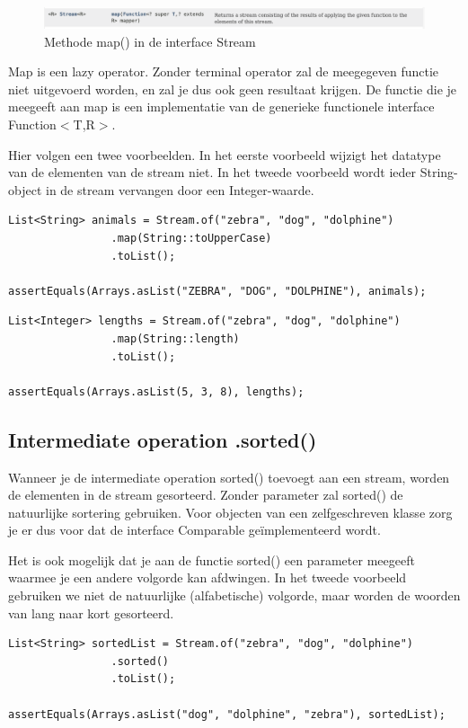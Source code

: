 \begin{figure}[H]
  \includegraphics[width=\linewidth]{images/h6/stream_map.png}
  \caption{Methode map() in de interface Stream}
  \label{fig:stream_foreach}
\end{figure}

Map is een lazy operator. Zonder terminal operator zal de meegegeven functie niet uitgevoerd worden, en zal je dus ook geen resultaat krijgen. De functie die je meegeeft aan map is een implementatie van de generieke functionele interface Function$<$T,R$>$.

Hier volgen een twee voorbeelden. In het eerste voorbeeld wijzigt het datatype van de elementen van de stream niet. In het tweede voorbeeld wordt ieder String-object in de stream vervangen door een Integer-waarde.

\begin{lstlisting}
List<String> animals = Stream.of("zebra", "dog", "dolphine")
				.map(String::toUpperCase)
				.toList();

assertEquals(Arrays.asList("ZEBRA", "DOG", "DOLPHINE"), animals);
\end{lstlisting}

\begin{lstlisting}
List<Integer> lengths = Stream.of("zebra", "dog", "dolphine")
				.map(String::length)
				.toList();

assertEquals(Arrays.asList(5, 3, 8), lengths);
\end{lstlisting}

\subsection{Intermediate operation .sorted()}

Wanneer je de intermediate operation sorted() toevoegt aan een stream, worden de elementen in de stream gesorteerd. Zonder parameter zal sorted() de natuurlijke sortering gebruiken. Voor objecten van een zelfgeschreven klasse zorg je er dus voor dat de interface Comparable ge\"implementeerd wordt.

Het is ook mogelijk dat je aan de functie sorted() een parameter meegeeft waarmee je een andere volgorde kan afdwingen. In het tweede voorbeeld gebruiken we niet de natuurlijke (alfabetische) volgorde, maar worden de woorden van lang naar kort gesorteerd.


\begin{lstlisting}
List<String> sortedList = Stream.of("zebra", "dog", "dolphine")
				.sorted()
				.toList();

assertEquals(Arrays.asList("dog", "dolphine", "zebra"), sortedList);
\end{lstlisting}

